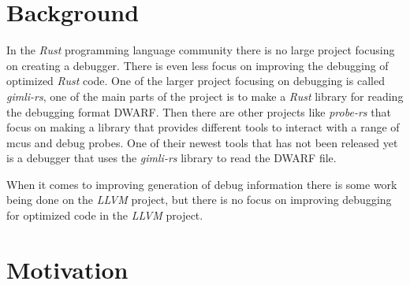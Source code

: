 \section{Background}


In the \emph{Rust} programming language community there is no large project focusing on creating a debugger.
There is even less focus on improving the debugging of optimized \emph{Rust} code.
One of the larger project focusing on debugging is called \emph{gimli-rs}, one of the main parts of the project is to make a \emph{Rust} library for reading the debugging format \gls{DWARF}.
Then there are other projects like \emph{probe-rs} that focus on making a library that provides different tools to interact with a range of \glspl{mcu} and debug probes.
One of their newest tools that has not been released yet is a debugger that uses the \emph{gimli-rs} library to read the \gls{DWARF} file.


When it comes to improving generation of debug information there is some work being done on the \emph{LLVM} project, but there is no focus on improving debugging for optimized code in the \emph{LLVM} project.



\section{Motivation}



